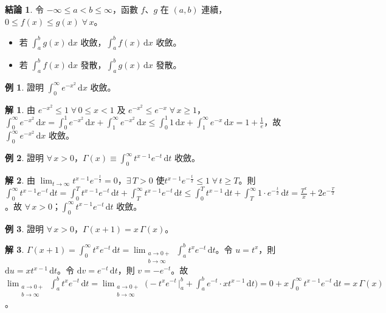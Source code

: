 \documentclass[12pt]{extarticle}
\newcommand{\ds}{\displaystyle}
\theoremstyle{definition}
\newtheorem*{fact}{結論}
\newtheorem*{ex}{例}
\newtheorem*{sol}{解}
\begin{document}
\begin{fact}
  令 $\ds -\infty\leqslant a < b \leqslant\infty$，函數 $f$、$g$ 在 $(a, b)$ 連續，$0\leqslant f(x)\leqslant g(x)\;\forall\,x$。
  \begin{itemize}\setlength\itemsep{0em}
    \item 若 $\ds\int_a^b g(x)\,\mathrm{d}x$ 收斂，$\ds\int_a^b f(x)\,\mathrm{d}x$ 收斂。
    \item 若 $\ds\int_a^b f(x)\,\mathrm{d}x$ 發散，$\ds\int_a^b g(x)\,\mathrm{d}x$ 發散。
  \end{itemize}
\end{fact}

\begin{ex}
  證明 $\ds\int_{0}^{\infty}e^{-x^2}\,\mathrm{d}x$ 收斂。
\end{ex}

\begin{sol}
  由 $\ds e^{-x^2}\leqslant 1\;\forall\,0 \leqslant x < 1$ 及 $\ds e^{-x^2}\leqslant e^{-x}\;\forall\,x\geqslant 1$，$\ds\int_{0}^{\infty}e^{-x^2}\,\mathrm{d}x = \int_{0}^1 e^{-x^2}\,\mathrm{d}x + \int_1^\infty e^{-x^2}\,\mathrm{d}x\leqslant\int_{0}^1 1\,\mathrm{d}x + \int_1^\infty e^{-x}\,\mathrm{d}x = 1 + \frac{1}{e}$，故 $\ds\int_{0}^{\infty}e^{-x^2}\,\mathrm{d}x$ 收斂。
\end{sol}

\begin{ex}
  證明 $\ds\forall\,x > 0$，$\ds\Gamma(x)\equiv\int_{0}^{\infty}t^{x-1}e^{-t}\,\mathrm{d}t$ 收斂。
\end{ex}

\begin{sol}
  由 $\ds\lim_{t\to\infty}t^{x-1}e^{-\frac{t}{2}} = 0$，$\ds\exists\,T > 0$ 使$\ds t^{x-1}e^{-\frac{t}{2}}\leqslant 1\;\forall\,t\geqslant T$。則 $\ds\int_{0}^{\infty}t^{x-1}e^{-t}\,\mathrm{d}t = \int_{0}^T t^{x-1}e^{-t}\,\mathrm{d}t + \int_T^\infty t^{x-1}e^{-t}\,\mathrm{d}t\leqslant\int_{0}^T t^{x - 1}\,\mathrm{d}t + \int_T^\infty 1\cdot e^{-\frac{t}{2}}\,\mathrm{d}t = \frac{T^x}{x} + 2e^{-\frac{T}{2}}$。故 $\forall\,x > 0$；$\ds\int_{0}^{\infty}t^{x-1}e^{-t}\,\mathrm{d}t$ 收斂。
\end{sol}

\begin{ex}
  證明 $\forall\,x > 0$，$\ds\Gamma(x + 1) = x\,\Gamma(x)$。
\end{ex}

\begin{sol}
  $\ds\Gamma(x + 1) =\int_{0}^{\infty} t^x e^{-t}\,\mathrm{d}t = \lim_{\substack{a\to0+ \\ b\to\infty}}\int_a^b t^{x}e^{-t}\,\mathrm{d}t$。令 $\ds u = t^x$，則 $\ds\mathrm{d}u = xt^{x-1}\,\mathrm{d}t$。令 $\ds\mathrm{d}v = e^{-t}\,\mathrm{d}t$，則 $\ds v = -e^{-t}$。故 $\ds\lim_{\substack{a\to0+\\b\to\infty}}\int_a^b t^{x}e^{-t}\,\mathrm{d}t = \lim_{\substack{a\to0+\\b\to\infty}}\Big(-t^x e^{-t}\,\Big|_a^b + \int_a^b e^{-t}\cdot xt^{x-1}\,\mathrm{d}t\Big) = 0 + x\int_0^\infty t^{x-1}e^{-t}\,\mathrm{d}t =x\,\Gamma(x)$。
\end{sol}
\end{document}
